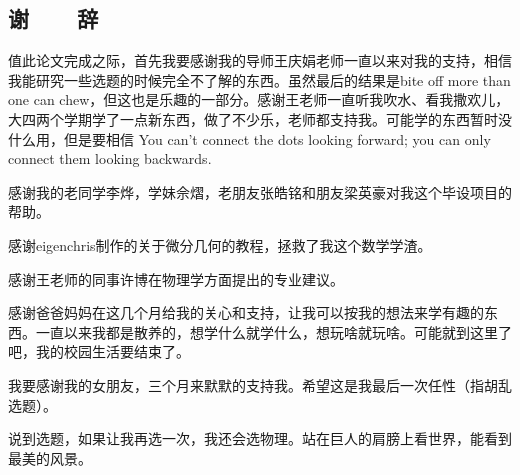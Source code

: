 %
%
%
%
%
%

\begin{center}
\chapter*{\vskip 10bp \textbf{谢~~~~辞} \vskip -6bp}
\end{center}


值此论文完成之际，首先我要感谢我的导师王庆娟老师一直以来对我的支持，相信我能研究一些选题的时候完全不了解的东西。虽然最后的结果是bite off more than one can chew，但这也是乐趣的一部分。感谢王老师一直听我吹水、看我撒欢儿，大四两个学期学了一点新东西，做了不少乐，老师都支持我。可能学的东西暂时没什么用，但是要相信 You can't connect the dots looking forward; you can only connect them looking backwards\cite{steve_jobs_stanford}.

感谢我的老同学李烨，学妹佘熠，老朋友张皓铭和朋友梁英豪对我这个毕设项目的帮助。

感谢eigenchris制作的关于微分几何的教程，拯救了我这个数学学渣。

感谢王老师的同事许博在物理学方面提出的专业建议。

感谢爸爸妈妈在这几个月给我的关心和支持，让我可以按我的想法来学有趣的东西。一直以来我都是散养的，想学什么就学什么，想玩啥就玩啥。可能就到这里了吧，我的校园生活要结束了。

我要感谢我的女朋友，三个月来默默的支持我。希望这是我最后一次任性（指胡乱选题）。

说到选题，如果让我再选一次，我还会选物理。站在巨人的肩膀上看世界，能看到最美的风景。

